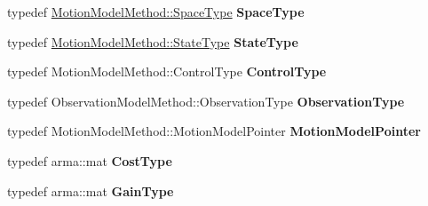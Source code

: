 \begin{DoxyCompactItemize}
\item 
\hypertarget{class_separated_controller_method_af037a93db2d2c315265bf3df79231ebc}{typedef \*
\hyperlink{class_s_e2_belief_space}{\-Motion\-Model\-Method\-::\-Space\-Type} {\bfseries \-Space\-Type}}\label{class_separated_controller_method_af037a93db2d2c315265bf3df79231ebc}

\item 
\hypertarget{class_separated_controller_method_a69af9f746a9cb93e9807eee8df538258}{typedef \*
\hyperlink{class_s_e2_belief_space_1_1_state_type}{\-Motion\-Model\-Method\-::\-State\-Type} {\bfseries \-State\-Type}}\label{class_separated_controller_method_a69af9f746a9cb93e9807eee8df538258}

\item 
\hypertarget{class_separated_controller_method_a969bf25e6b70eb1b1ae3adf2ae3bb813}{typedef \*
\-Motion\-Model\-Method\-::\-Control\-Type {\bfseries \-Control\-Type}}\label{class_separated_controller_method_a969bf25e6b70eb1b1ae3adf2ae3bb813}

\item 
\hypertarget{class_separated_controller_method_a108499f2f2ba359907aba634d6812854}{typedef \*
\-Observation\-Model\-Method\-::\-Observation\-Type {\bfseries \-Observation\-Type}}\label{class_separated_controller_method_a108499f2f2ba359907aba634d6812854}

\item 
\hypertarget{class_separated_controller_method_a2ebae1dd9ad6568e6cf14fe82808a68d}{typedef \*
\-Motion\-Model\-Method\-::\-Motion\-Model\-Pointer {\bfseries \-Motion\-Model\-Pointer}}\label{class_separated_controller_method_a2ebae1dd9ad6568e6cf14fe82808a68d}

\item 
\hypertarget{class_separated_controller_method_a68eeb1e05fd5b6bff498c0e77fb4e4df}{typedef arma\-::mat {\bfseries \-Cost\-Type}}\label{class_separated_controller_method_a68eeb1e05fd5b6bff498c0e77fb4e4df}

\item 
\hypertarget{class_separated_controller_method_a419460dff807103eed3f1043e9fcbb7c}{typedef arma\-::mat {\bfseries \-Gain\-Type}}\label{class_separated_controller_method_a419460dff807103eed3f1043e9fcbb7c}

\end{DoxyCompactItemize}
